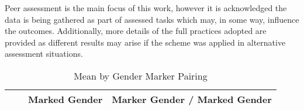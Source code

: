 \documentclass[sigconf, anonymous=true]{acmart}
\begin{document}
Peer assessment is the main focus of this work, however it is acknowledged the data is being gathered as part of assessed tasks which may, in some way, influence the outcomes. Additionally, more details of the full practices adopted are provided as different results may arise if the scheme was applied in alternative assessment situations.
\begin{table*}[ht]
	\caption{Mean by Gender Marker Pairing}
	\begin{tabular} {| p{2cm} | p{7cm} | p{1cm}| p{1cm} | p{1cm}| p{1cm} |p{1cm} |p{1cm} |} 
		\hline
		
		& & \multicolumn{2}{c}{Marked Gender}& \multicolumn{4}{c}{Marker Gender  / Marked Gender }  \\
		\hline
		
		
		

\end{tabular}
\end{table*}
\end{document}
